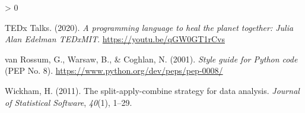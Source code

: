 \documentclass[
  notoc %
]{tufte-book}
\newlength{\cslhangindent}
\newenvironment{CSLReferences}[2] %
 {%
  \setlength{\parindent}{0pt}
  \ifodd #1 \everypar{\setlength{\hangindent}{\cslhangindent}}\ignorespaces\fi
  \ifnum #2 > 0
  \setlength{\parskip}{#2\baselineskip}
  \fi
 }%
 {}
\begin{document}
\begin{CSLReferences}{1}{0}
\leavevmode\hypertarget{ref-tedxtalksProgrammingLanguageHeal2020}{}%
TEDx Talks. (2020). \emph{A programming language to heal the planet
together: {Julia} \textbar{} {Alan Edelman} \textbar{} {TEDxMIT}}.
\url{https://youtu.be/qGW0GT1rCvs}

\leavevmode\hypertarget{ref-pep8}{}%
van Rossum, G., Warsaw, B., \& Coghlan, N. (2001). \emph{Style guide for
{Python} code} (PEP No. 8).
\url{https://www.python.org/dev/peps/pep-0008/}

\leavevmode\hypertarget{ref-wickham2011split}{}%
Wickham, H. (2011). The split-apply-combine strategy for data analysis.
\emph{Journal of Statistical Software}, \emph{40}(1), 1--29.

\end{CSLReferences}

\backmatter
\end{document}
